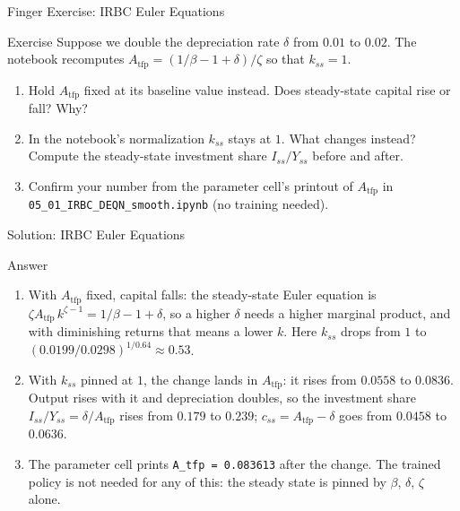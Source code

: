 \documentclass[aspectratio=169,11pt]{beamer}
\newcommand{\emphc}[1]{\textcolor{harvardcrimson}{#1}}
\begin{document}
\begin{frame}{\exercisepause{} Finger Exercise: IRBC Euler Equations}
\begin{exampleblock}{Exercise}
Suppose we \emphc{double} the depreciation rate $\delta$ from $0.01$ to $0.02$. The notebook recomputes $A_{\text{tfp}} = (1/\beta - 1 + \delta)/\zeta$ so that $k_{ss} = 1$.
\begin{enumerate}
    \item Hold $A_{\text{tfp}}$ fixed at its baseline value instead. Does steady-state capital rise or fall? Why?
    \item In the notebook's normalization $k_{ss}$ stays at $1$. What changes instead? Compute the steady-state investment share $I_{ss}/Y_{ss}$ before and after.
    \item Confirm your number from the parameter cell's printout of $A_{\text{tfp}}$ in \texttt{05\_01\_IRBC\_DEQN\_smooth.ipynb} (no training needed).
\end{enumerate}
\end{exampleblock}
\end{frame}

\begin{frame}{Solution: IRBC Euler Equations}
\begin{block}{Answer}
\begin{enumerate}
    \item With $A_\mathrm{tfp}$ fixed, capital \emphc{falls}: the steady-state Euler equation is $\zeta A_\mathrm{tfp}\, k^{\zeta - 1} = 1/\beta - 1 + \delta$, so a higher $\delta$ needs a higher marginal product, and with diminishing returns that means a lower $k$. Here $k_{ss}$ drops from $1$ to $(0.0199/0.0298)^{1/0.64} \approx 0.53$.
    \item With $k_{ss}$ pinned at $1$, the change lands in $A_\mathrm{tfp}$: it rises from $0.0558$ to $0.0836$. Output rises with it and depreciation doubles, so the investment share $I_{ss}/Y_{ss} = \delta/A_\mathrm{tfp}$ \emphc{rises} from $0.179$ to $0.239$; $c_{ss} = A_\mathrm{tfp} - \delta$ goes from $0.0458$ to $0.0636$.
    \item The parameter cell prints \texttt{A\_tfp = 0.083613} after the change. The trained policy is not needed for any of this: the steady state is pinned by $\beta$, $\delta$, $\zeta$ alone.
\end{enumerate}
\end{block}
\end{frame}

\end{document}
